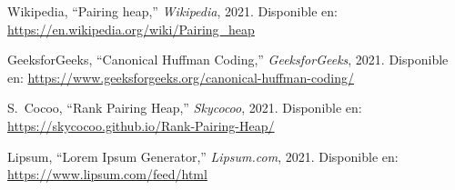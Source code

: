 \documentclass{ieeetj}
\begin{document}
\begin{thebibliography}{9}
 Wikipedia, ``Pairing heap,'' \textit{Wikipedia}, 2021. Disponible en: \url{https://en.wikipedia.org/wiki/Pairing_heap}

 GeeksforGeeks, ``Canonical Huffman Coding,'' \textit{GeeksforGeeks}, 2021. Disponible en: \url{https://www.geeksforgeeks.org/canonical-huffman-coding/}


 S.~Cocoo, ``Rank Pairing Heap,'' \textit{Skycocoo}, 2021. Disponible en: \url{https://skycocoo.github.io/Rank-Pairing-Heap/}

 Lipsum, ``Lorem Ipsum Generator,'' \textit{Lipsum.com}, 2021. Disponible en: \url{https://www.lipsum.com/feed/html}

\end{thebibliography}
\end{document}

